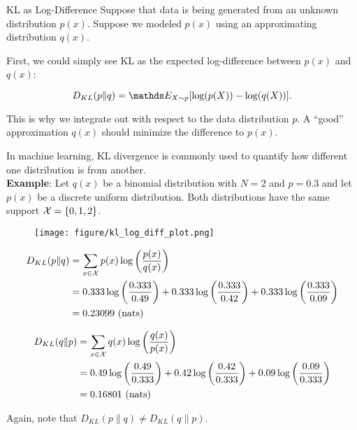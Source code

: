 \documentclass[11pt,compress,t,notes=noshow, xcolor=table]{beamer}
\begin{document}
\begin{vbframe} {KL as Log-Difference}
Suppose that data is being generated from an unknown distribution $p(x)$. 
Suppose we modeled $p(x)$ using an approximating distribution $q(x)$. 

\lz

First, we could simply see KL as the expected log-difference between $p(x)$ and $q(x)$:

  $$ D_{KL}(p \| q) = \E_{X \sim p}[\log(p(X)) - \log(q(X))].$$

This is why we integrate out with respect to the data distribution $p$.
A \enquote{good} approximation $q(x)$ should minimize the difference to $p(x)$.

\framebreak

In machine learning, KL divergence is commonly used to quantify how different one distribution is from another.\\
\lz
\textbf{Example}:
Let $q(x)$ be a binomial distribution with $N = 2$ and $p = 0.3$ and let $p(x)$ be a discrete uniform distribution. Both distributions have the same support $\mathcal{X} = \{0, 1, 2\}$.

\begin{figure}
\texttt{[image: figure/kl\_log\_diff\_plot.png]} 
\end{figure}

\framebreak

\begin{equation*}
  \begin{split}
 D_{KL}(p \| q) &= \sum_{x \in \mathcal{X}} p(x) \log \left( \frac{p(x)}{q(x)} \right)
 \\ &= 0.333 \log \left( \frac{0.333}{0.49} \right) + 0.333 \log \left( \frac{0.333}{0.42} \right) + 0.333 \log \left( \frac{0.333}{0.09} \right) \\ &= 0.23099 \text{    (nats)}
  \end{split}
\end{equation*}

\begin{equation*}
  \begin{split}
 D_{KL}(q \| p) &= \sum_{x \in \mathcal{X}} q(x) \log \left( \frac{q(x)}{p(x)} \right)
 \\ &= 0.49 \log \left( \frac{0.49}{0.333} \right) + 0.42 \log \left( \frac{0.42}{0.333} \right) + 0.09 \log \left( \frac{0.09}{0.333} \right) \\ &= 0.16801 \text{    (nats)}
  \end{split}
\end{equation*}

Again, note that $D_{KL}(p \| q) \neq D_{KL}(q \| p)$.
\end{vbframe}
\end{document}
